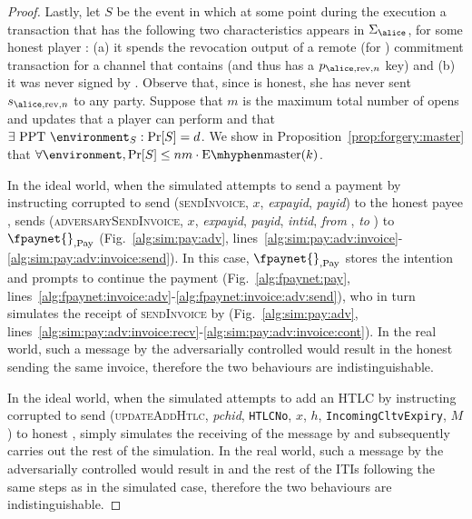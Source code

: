 \begin{proof}
  Lastly, let $S$ be the event in which at some point during the execution a
  transaction that has the following two characteristics appears in
  $\Sigma_{\alice}$, for some honest player \alice: (a) it spends the revocation
  output of a remote (for \alice{}) commitment transaction for a channel that
  contains \alice{} (and thus has a $p_{\alice, \mathrm{rev}, n}$ key) and (b)
  it was never signed by \alice. Observe that, since \alice{} is honest, she has
  never sent $s_{\alice, \mathrm{rev}, n}$ to any party. Suppose that $m$ is the
  maximum total number of opens and updates that a player can perform and that
  $\exists \text{ PPT } \environment_S: \Pr[S] = d$. We show in
  Proposition~\ref{prop:forgery:master} that $\forall \environment, \Pr[S] \leq
  nm \cdot \mathrm{E \mhyphen master}(k)$.

  In the ideal world, when the simulated \adversary{} attempts to send a
  payment by instructing corrupted \alice{} to send (\textsc{sendInvoice}, $x$,
  \textit{expayid}, \textit{payid}) to the honest payee \bob, \simulator{} sends
  (\textsc{adversarySendInvoice}, $x$, \textit{expayid}, \textit{payid},
  \textit{intid}, \textit{from} \alice, \textit{to} \bob) to
  $\fpaynet{}_{\mathrm{, Pay}}$ (Fig.~\ref{alg:sim:pay:adv},
  lines~\ref{alg:sim:pay:adv:invoice}-\ref{alg:sim:pay:adv:invoice:send}). In
  this case, $\fpaynet{}_{\mathrm{, Pay}}$ stores the intention and prompts
  \simulator{} to continue the payment (Fig.~\ref{alg:fpaynet:pay},
  lines~\ref{alg:fpaynet:invoice:adv}-\ref{alg:fpaynet:invoice:adv:send}), who
  in turn simulates the receipt of \textsc{sendInvoice} by \bob{}
  (Fig.~\ref{alg:sim:pay:adv},
  lines~\ref{alg:sim:pay:adv:invoice:recv}-\ref{alg:sim:pay:adv:invoice:cont}).
  In the real world, such a message by the adversarially controlled \alice{}
  would result in the honest \bob{} sending the same invoice, therefore the two
  behaviours are indistinguishable.

  In the ideal world, when the simulated \adversary{} attempts to add an
  HTLC by instructing corrupted \alice{} to send (\textsc{updateAddHtlc},
  \textit{pchid}, \texttt{HTLCNo}, $x$, $h$, \texttt{IncomingCltvExpiry}, $M$)
  to honest \bob, \simulator{} simply simulates the receiving of the message by
  \bob{} and subsequently carries out the rest of the simulation. In the real
  world, such a message by the adversarially controlled \alice{} would result in
  \bob{} and the rest of the ITIs following the same steps as in the simulated
  case, therefore the two behaviours are indistinguishable.


\end{proof}
